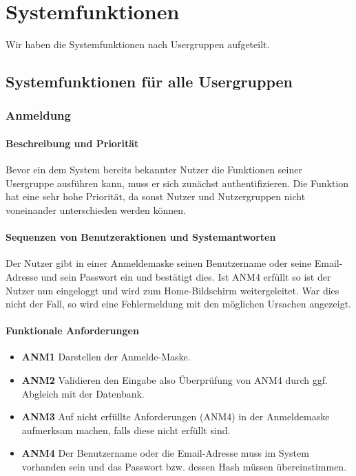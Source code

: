 \section{Systemfunktionen}
\label{system_features}

Wir haben die Systemfunktionen nach Usergruppen aufgeteilt.

\subsection{Systemfunktionen für alle Usergruppen}
\subsubsection{Anmeldung}
\paragraph{Beschreibung und Priorität}

Bevor ein dem System bereits bekannter Nutzer die Funktionen seiner Usergruppe ausführen kann, muss er sich zunächst authentifizieren. Die Funktion hat eine sehr hohe Priorität, da sonst Nutzer und Nutzergruppen nicht voneinander unterschieden werden können.

\paragraph{Sequenzen von Benutzeraktionen und Systemantworten}

Der Nutzer gibt in einer Anmeldemaske seinen Benutzername oder seine Email-Adresse und sein Passwort ein und bestätigt dies. Ist ANM4 erfüllt so ist der Nutzer nun eingeloggt und wird zum Home-Bildschirm weitergeleitet. War dies nicht der Fall, so wird eine Fehlermeldung mit den möglichen Ursachen angezeigt.

\paragraph{Funktionale Anforderungen}
\begin{itemize}
	\item \textbf{ANM1} Darstellen der Anmelde-Maske.
	\item \textbf{ANM2} Validieren den Eingabe also Überprüfung von ANM4 durch ggf. Abgleich mit der Datenbank.
	\item \textbf{ANM3} Auf nicht erfüllte Anforderungen (ANM4) in der Anmeldemaske aufmerksam machen, falls diese nicht erfüllt sind.
	\item \textbf{ANM4} Der Benutzername oder die Email-Adresse muss im System vorhanden sein und das Passwort bzw. dessen Hash müssen übereinstimmen.
\end{itemize}

